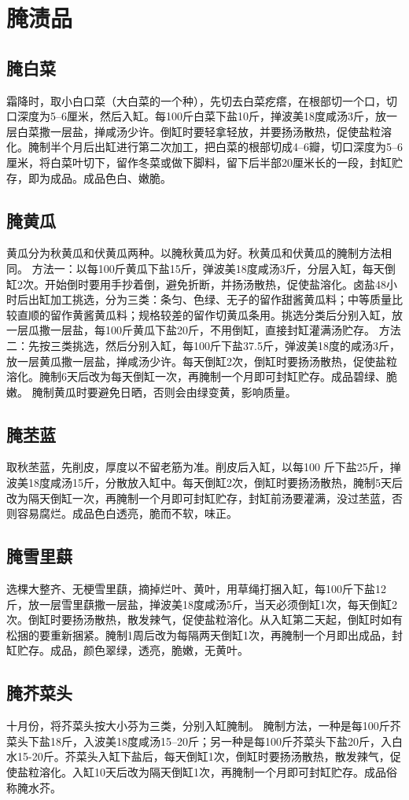 \documentclass{ctexbook}
\begin{document}
\section{腌渍品}
\subsection{腌白菜}	
霜降时，取小白口菜（大白菜的一个种），先切去白菜疙瘩，在根部切一个口，切口深度为5--6厘米，然后入缸。每100斤白菜下盐10斤，掸波美18度咸汤3斤，放一层白菜撒一层盐，掸咸汤少许。倒缸时要轻拿轻放，并要扬汤散热，促使盐粒溶化。腌制半个月后出缸进行第二次加工，把白菜的根部切成4--6瓣，切口深度为5--6厘米，将白菜叶切下，留作冬菜或做下脚料，留下后半部20厘米长的一段，封缸贮存，即为成品。成品色白、嫩脆。
\subsection{腌黄瓜}
黄瓜分为秋黄瓜和伏黄瓜两种。以腌秋黄瓜为好。秋黄瓜和伏黄瓜的腌制方法相同。
方法一：以每100斤黄瓜下盐15斤，弹波美18度咸汤3斤，分层入缸，每天倒缸2次。开始倒时要用手抄着倒，避免折断，并扬汤散热，促使盐溶化。卤盐48小时后出缸加工挑选，分为三类：条匀、色绿、无子的留作甜酱黄瓜料；中等质量比较直顺的留作黄酱黄瓜料；规格较差的留作切黄瓜条用。挑选分类后分别入缸，放一层瓜撒一层盐，每100斤黄瓜下盐20斤，不用倒缸，直接封缸灌满汤贮存。
方法二：先按三类挑选，然后分别入缸，每100斤下盐37.5斤，弹波美18度的咸汤3斤，放一层黄瓜撒一层盐，掸咸汤少许。每天倒缸2次，倒缸时要扬汤散热，促使盐粒溶化。腌制6天后改为每天倒缸一次，再腌制一个月即可封缸贮存。成品碧绿、脆嫩。
腌制黄瓜时要避免日晒，否则会由绿变黄，影响质量。
\subsection{腌苤蓝}
取秋苤蓝，先削皮，厚度以不留老筋为准。削皮后入缸，以每100
斤下盐25斤，掸波美18度咸汤15斤，分散放入缸中。每天倒缸2次，倒缸时要扬汤散热，腌制5天后改为隔天倒缸一次，再腌制一个月即可封缸贮存，封缸前汤要灌满，没过苤蓝，否则容易腐烂。成品色白透亮，脆而不软，味正。
\subsection{腌雪里蕻}
选棵大整齐、无梗雪里蕻，摘掉烂叶、黄叶，用草绳打捆入缸，每100斤下盐12斤，放一层雪里蕻撒一层盐，掸波美18度咸汤5斤，当天必须倒缸1次，每天倒缸2次。倒缸时要扬汤散热，散发辣气，促使盐粒溶化。从入缸第二天起，倒缸时如有松捆的要重新捆紧。腌制1周后改为每隔两天倒缸1次，再腌制一个月即出成品，封缸贮存。成品，颜色翠绿，透亮，脆嫩，无黄叶。
\subsection{腌芥菜头}
十月份，将芥菜头按大小芬为三类，分别入缸腌制。
腌制方法，一种是每100斤芥菜头下盐18斤，入波美18度咸汤15--20斤；另一种是每100斤芥菜头下盐20斤，入白水15-20斤。芥菜头入缸下盐后，每天倒缸1次，倒缸时要扬汤散热，散发辣气，促使盐粒溶化。入缸10天后改为隔天倒缸1次，再腌制一个月即可封缸贮存。成品俗称腌水芥。
\end{document}
